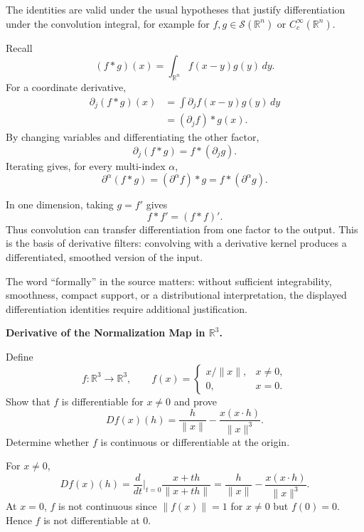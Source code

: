 \begin{solution}
The identities are valid under the usual hypotheses that justify differentiation under the
convolution integral, for example for \(f,g\in\mathcal S(\mathbb R^n)\) or
\(C_c^\infty(\mathbb R^n)\).

Recall
\[
(f*g)(x)
=
\int_{\mathbb R^n}f(x-y)g(y)\,dy.
\]
For a coordinate derivative,
\[
\begin{aligned}
\partial_j(f*g)(x)
&=
\int
\partial_jf(x-y)g(y)\,dy\\
&=
(\partial_jf)*g(x).
\end{aligned}
\]
By changing variables and differentiating the other factor,
\[
\partial_j(f*g)
=
f*(\partial_jg).
\]
Iterating gives, for every multi-index \(\alpha\),
\[
\boxed{
\partial^\alpha(f*g)
=
(\partial^\alpha f)*g
=
f*(\partial^\alpha g).
}
\]

In one dimension, taking \(g=f'\) gives
\[
f*f'
=
(f*f)'.
\]
Thus convolution can transfer differentiation from one factor to the output. This is the
basis of derivative filters: convolving with a derivative kernel produces a differentiated,
smoothed version of the input.

The word ``formally'' in the source matters: without sufficient integrability, smoothness,
compact support, or a distributional interpretation, the displayed differentiation
identities require additional justification.
\end{solution}


\begin{problem}[CP-II-0096]
\label{prob:cp-ii-0096}
\textbf{Derivative of the Normalization Map in \(\mathbb R^3\).}

\hspace*{1.5em}Define
\[
f:\mathbb R^3\to\mathbb R^3,
\qquad
f(x)=
\begin{cases}
x/\|x\|,&x\ne0,\\
0,&x=0.
\end{cases}
\]
Show that \(f\) is differentiable for \(x\ne0\) and prove
\[
Df(x)(h)
=
\frac{h}{\|x\|}
-
\frac{x(x\cdot h)}{\|x\|^3}.
\]
Determine whether \(f\) is continuous or differentiable at the origin.
\end{problem}

\begin{solution}
For $x\ne0$,
\[
Df(x)(h)=\frac{d}{dt}\bigg|_{t=0}\frac{x+th}{\|x+th\|}
=\frac{h}{\|x\|}-\frac{x(x\cdot h)}{\|x\|^3}.
\]
At $x=0$, $f$ is not continuous since $\|f(x)\|=1$ for $x\ne0$ but $f(0)=0$.
Hence $f$ is not differentiable at $0$.
\end{solution}

